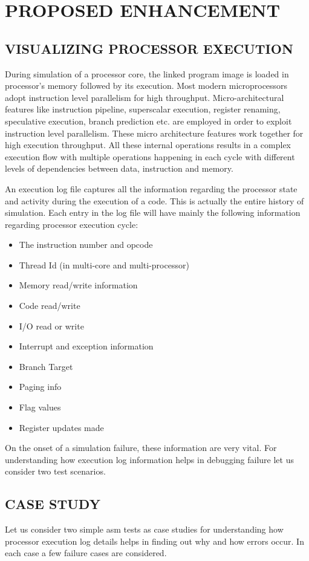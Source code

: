 \chapter{PROPOSED ENHANCEMENT}
\label{chap:enhancement.tex}

\section {VISUALIZING PROCESSOR EXECUTION}

During simulation of a processor core, the linked program image is loaded in processor's memory followed by its execution. Most modern microprocessors adopt instruction level parallelism for high throughput. Micro-architectural features like instruction pipeline, superscalar execution, register renaming, speculative execution, branch prediction etc. are employed in order to exploit instruction level parallelism.  These micro architecture features work together for high execution throughput. All these internal operations results in a complex execution flow with multiple operations happening in each cycle with different levels of dependencies between data, instruction and memory.


An execution log file captures all the information regarding the processor state and activity during the execution of a code. This is actually the entire history of simulation. Each entry in the log file will have mainly the following information regarding processor execution cycle:
\begin{itemize}
	\item The instruction number and opcode
	\item Thread Id (in multi-core and multi-processor)
	\item Memory read/write information
	\item Code read/write
	\item I/O read or write
	\item Interrupt and exception information
	\item Branch Target
	\item Paging info
	\item Flag values
	\item Register updates made
\end{itemize}
On the onset of a simulation failure, these information are very vital. For understanding how execution log information helps in debugging failure let us consider two test scenarios.

\section {CASE STUDY}
Let us consider two simple asm tests as case studies for understanding how processor execution log details helps in finding out why and how errors occur. In each case a few failure cases are considered. 
